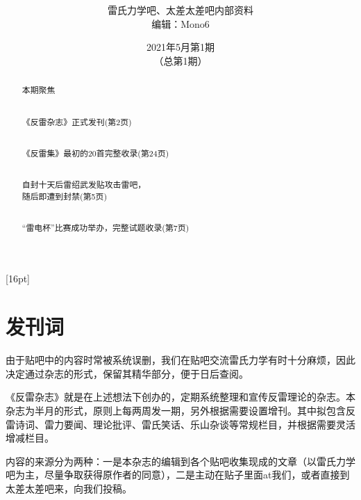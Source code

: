\documentclass[UTF8,12pt,oneside]{ctexbook}
\title{\textbf{\fontsize{42}{84}{反雷杂志 \\[15] Anti-Lei Magazine}}}
\author{\LARGE \kaishu 雷氏力学吧、太差太差吧内部资料 \\[8] \LARGE \kaishu 编辑：Mono6}
\date{\huge 2021年5月第1期 \\ （总第1期）}
\begin{document}
    
    \maketitle
    
    \setcounter{secnumdepth}{-2} 
    \setcounter{tocdepth}{2}
    [16pt]{\addvspace{2pt}\filright}
    {\contentspush{\thecontentslabel\hspace{0.8em}}}
    {}{\contentspage}
    
    \begin{abstract}
        \chapter{本期聚焦}
        \begin{center}
            \Large
            \kaishu
            ~\\
            《反雷杂志》正式发刊(第2页)
            
            ~\\
            《反雷集》最初的20首完整收录(第24页)
            
            ~\\
            自封十天后雷绍武发贴攻击雷吧，\\随后即遭到封禁(第5页)
            
            ~\\
            “雷电杯”比赛成功举办，完整试题收录(第7页)
            
            \songti
            \normalsize
        \end{center}
    \end{abstract}
    
    \chapter{发刊词}
    由于贴吧中的内容时常被系统误删，我们在贴吧交流雷氏力学有时十分麻烦，因此决定通过杂志的形式，保留其精华部分，便于日后查阅。
    
    《反雷杂志》就是在上述想法下创办的，定期系统整理和宣传反雷理论的杂志。本杂志为半月的形式，原则上每两周发一期，另外根据需要设置增刊。其中拟包含反雷诗词、雷力要闻、理论批评、雷氏笑话、乐山杂谈等常规栏目，并根据需要灵活增减栏目。
    
    内容的来源分为两种：一是本杂志的编辑到各个贴吧收集现成的文章（以雷氏力学吧为主，尽量争取获得原作者的同意），二是主动在贴子里面at我们，或者直接到太差太差吧来，向我们投稿。
    
\end{document}
